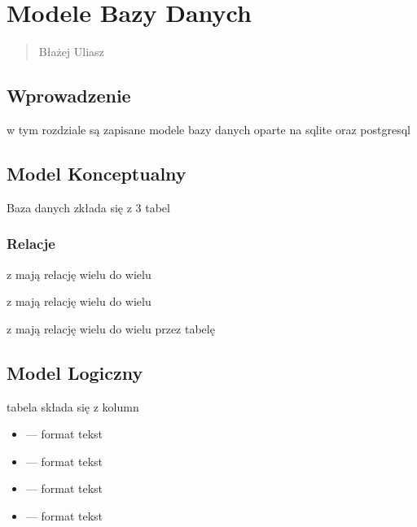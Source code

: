 \documentclass[letterpaper,10pt,polish]{sphinxmanual}
\begin{document}
\sphinxstepscope


\chapter{Modele Bazy Danych}
\label{\detokenize{rozdzial3/index:modele-bazy-danych}}\label{\detokenize{rozdzial3/index::doc}}\begin{quote}\begin{description}
\sphinxAtStartPar
Błażej Uliasz

\end{description}\end{quote}


\section{Wprowadzenie}
\label{\detokenize{rozdzial3/index:wprowadzenie}}
\sphinxAtStartPar
w tym rozdziale są zapisane modele bazy danych oparte na sqlite oraz postgresql


\section{Model Konceptualny}
\label{\detokenize{rozdzial3/index:model-konceptualny}}
\sphinxAtStartPar
Baza danych zkłada się z 3 tabel   


\subsection{Relacje}
\label{\detokenize{rozdzial3/index:relacje}}
\sphinxAtStartPar
{} z  mają relację wielu do wielu

\sphinxAtStartPar
{} z  mają relację wielu do wielu

\sphinxAtStartPar
{} z  mają relację wielu do wielu przez tabelę 


\section{Model Logiczny}
\label{\detokenize{rozdzial3/index:model-logiczny}}
\sphinxAtStartPar
tabela  składa się z kolumn
\begin{itemize}
\item {} 
\sphinxAtStartPar
{} — format tekst

\item {} 
\sphinxAtStartPar
{} — format tekst

\item {} 
\sphinxAtStartPar
{} — format tekst

\item {} 
\sphinxAtStartPar
{} — format tekst

\end{itemize}
\end{document}
